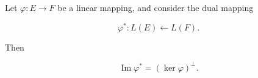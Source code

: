 Let $\varphi: E \rightarrow F$ be a linear mapping, and consider the dual mapping

$$\varphi^*: L(E) \leftarrow L(F).$$

Then

$$\operatorname{Im} \varphi^* = (\ker \varphi)^\perp.$$
